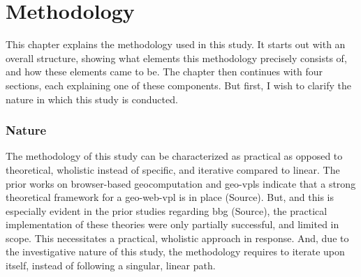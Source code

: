 \chapter{Methodology}
\label{chap:methodology}

This chapter explains the methodology used in this study. 
It starts out with an overall structure, showing what elements this methodology precisely consists of, and how these elements came to be. 
The chapter then continues with four sections, each explaining one of these components.
But first, I wish to clarify the nature in which this study is conducted. 

\subsection*{Nature}
The methodology of this study can be characterized as practical as opposed to theoretical, wholistic instead of specific, and iterative compared to linear. The prior works on browser-based geocomputation and geo-vpls indicate that a strong theoretical framework for a \ac{geo-web-vpl} is in place (Source). 
But, and this is especially evident in the prior studies regarding \ac{bbg} (Source), the practical implementation of these theories were only partially successful, and limited in scope. 
This necessitates a practical, wholistic approach in response. 
And, due to the investigative nature of this study, the methodology requires to iterate upon itself, instead of following a singular, linear path. 



